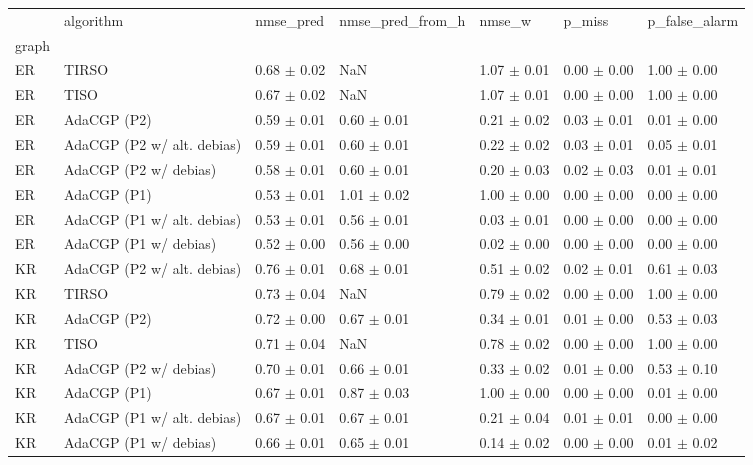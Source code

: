 \begin{tabular}{lllllll}
\toprule
 & algorithm & nmse_pred & nmse_pred_from_h & nmse_w & p_miss & p_false_alarm \\
graph &  &  &  &  &  &  \\
\midrule
ER & TIRSO & 0.68 $\pm$ 0.02 & NaN & 1.07 $\pm$ 0.01 & 0.00 $\pm$ 0.00 & 1.00 $\pm$ 0.00 \\
ER & TISO & 0.67 $\pm$ 0.02 & NaN & 1.07 $\pm$ 0.01 & 0.00 $\pm$ 0.00 & 1.00 $\pm$ 0.00 \\
ER & AdaCGP (P2) & 0.59 $\pm$ 0.01 & 0.60 $\pm$ 0.01 & 0.21 $\pm$ 0.02 & 0.03 $\pm$ 0.01 & 0.01 $\pm$ 0.00 \\
ER & AdaCGP (P2 w/ alt. debias) & 0.59 $\pm$ 0.01 & 0.60 $\pm$ 0.01 & 0.22 $\pm$ 0.02 & 0.03 $\pm$ 0.01 & 0.05 $\pm$ 0.01 \\
ER & AdaCGP (P2 w/ debias) & 0.58 $\pm$ 0.01 & 0.60 $\pm$ 0.01 & 0.20 $\pm$ 0.03 & 0.02 $\pm$ 0.03 & 0.01 $\pm$ 0.01 \\
ER & AdaCGP (P1) & 0.53 $\pm$ 0.01 & 1.01 $\pm$ 0.02 & 1.00 $\pm$ 0.00 & 0.00 $\pm$ 0.00 & 0.00 $\pm$ 0.00 \\
ER & AdaCGP (P1 w/ alt. debias) & 0.53 $\pm$ 0.01 & 0.56 $\pm$ 0.01 & 0.03 $\pm$ 0.01 & 0.00 $\pm$ 0.00 & 0.00 $\pm$ 0.00 \\
ER & AdaCGP (P1 w/ debias) & 0.52 $\pm$ 0.00 & 0.56 $\pm$ 0.00 & 0.02 $\pm$ 0.00 & 0.00 $\pm$ 0.00 & 0.00 $\pm$ 0.00 \\
KR & AdaCGP (P2 w/ alt. debias) & 0.76 $\pm$ 0.01 & 0.68 $\pm$ 0.01 & 0.51 $\pm$ 0.02 & 0.02 $\pm$ 0.01 & 0.61 $\pm$ 0.03 \\
KR & TIRSO & 0.73 $\pm$ 0.04 & NaN & 0.79 $\pm$ 0.02 & 0.00 $\pm$ 0.00 & 1.00 $\pm$ 0.00 \\
KR & AdaCGP (P2) & 0.72 $\pm$ 0.00 & 0.67 $\pm$ 0.01 & 0.34 $\pm$ 0.01 & 0.01 $\pm$ 0.00 & 0.53 $\pm$ 0.03 \\
KR & TISO & 0.71 $\pm$ 0.04 & NaN & 0.78 $\pm$ 0.02 & 0.00 $\pm$ 0.00 & 1.00 $\pm$ 0.00 \\
KR & AdaCGP (P2 w/ debias) & 0.70 $\pm$ 0.01 & 0.66 $\pm$ 0.01 & 0.33 $\pm$ 0.02 & 0.01 $\pm$ 0.00 & 0.53 $\pm$ 0.10 \\
KR & AdaCGP (P1) & 0.67 $\pm$ 0.01 & 0.87 $\pm$ 0.03 & 1.00 $\pm$ 0.00 & 0.00 $\pm$ 0.00 & 0.01 $\pm$ 0.00 \\
KR & AdaCGP (P1 w/ alt. debias) & 0.67 $\pm$ 0.01 & 0.67 $\pm$ 0.01 & 0.21 $\pm$ 0.04 & 0.01 $\pm$ 0.01 & 0.00 $\pm$ 0.00 \\
KR & AdaCGP (P1 w/ debias) & 0.66 $\pm$ 0.01 & 0.65 $\pm$ 0.01 & 0.14 $\pm$ 0.02 & 0.00 $\pm$ 0.00 & 0.01 $\pm$ 0.02 \\

\end{tabular}
